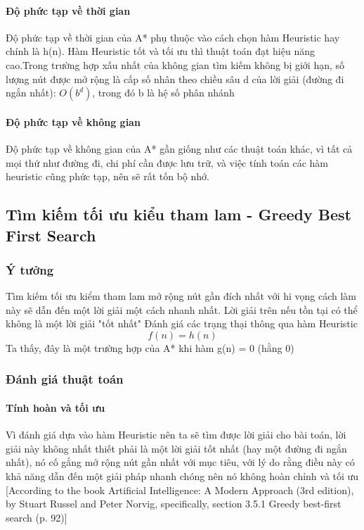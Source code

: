 \documentclass{article}
\begin{document}
\paragraph{Độ phức tạp về thời gian}
Độ phức tạp về thời gian của A* phụ thuộc vào cách chọn hàm Heuristic hay chính là h(n). Hàm Heuristic tốt và tối ưu thì thuật toán đạt hiệu năng cao.Trong trường hợp xấu nhất của không gian tìm kiếm không bị giới hạn, số lượng nút được mở rộng là cấp số nhân theo chiều sâu d của lời giải (đường đi ngắn nhất): $O(b^{d})$, trong đó b là hệ số phân nhánh
\paragraph{Độ phức tạp về không gian}
Độ phức tạp về không gian của A* gần giống như các thuật toán khác, vì tất cả mọi thứ như đường đi, chi phí cần được lưu trữ, và việc tính toán các hàm heuristic cũng phức tạp, nên sẽ rất tốn bộ nhớ.
\subsection{Tìm kiếm tối ưu kiểu tham lam - Greedy Best First Search}

\subsubsection{Ý tưởng}
Tìm kiếm tối ưu kiểm tham lam mở rộng nút gần đích nhất với hi vọng cách làm này sẽ dẫn đến một lời giải một cách nhanh nhất. Lời giải trên nếu tồn tại có thể không là một lời giải "tốt nhất"\newline
Đánh giá các trạng thại thông qua hàm Heuristic
$$f(n) = h(n)$$
Ta thấy, đây là một trường hợp của A* khi hàm g(n) = 0 (hằng 0)

\subsubsection{Đánh giá thuật toán}

\paragraph{Tính hoàn và tối ưu}
Vì đánh giá dựa vào hàm Heuristic nên ta sẽ tìm được lời giải cho bài toán, lời giải này không nhất thiết phải là một lời giải tốt nhất (hay một đường đi ngắn nhất), nó cố gắng mở rộng nút gần nhất với mục tiêu, với lý do rằng điều này có khả năng dẫn đến một giải pháp nhanh chóng nên nó không hoàn chỉnh và tối ưu [According to the book Artificial Intelligence: A Modern Approach (3rd edition), by Stuart Russel and Peter Norvig, specifically, section 3.5.1 Greedy best-first search (p. 92)]
\end{document}
